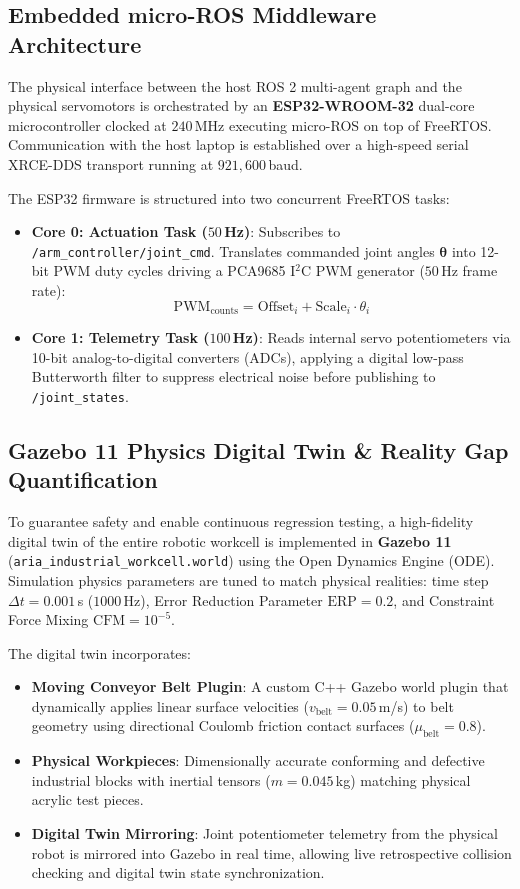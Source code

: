 \documentclass[journal]{IEEEtran}
\begin{document}
\subsection{Embedded micro-ROS Middleware Architecture}
The physical interface between the host ROS 2 multi-agent graph and the physical servomotors is orchestrated by an \textbf{ESP32-WROOM-32} dual-core microcontroller clocked at $240$\,MHz executing micro-ROS on top of FreeRTOS. Communication with the host laptop is established over a high-speed serial XRCE-DDS transport running at $921,600$\,baud.

The ESP32 firmware is structured into two concurrent FreeRTOS tasks:
\begin{itemize}
    \item \textbf{Core 0: Actuation Task ($50$\,Hz)}: Subscribes to \texttt{/arm\_controller/joint\_cmd}. Translates commanded joint angles $\boldsymbol{\theta}$ into 12-bit PWM duty cycles driving a PCA9685 I$^2$C PWM generator ($50$\,Hz frame rate):
    \begin{equation}
    \text{PWM}_{\text{counts}} = \text{Offset}_i + \text{Scale}_i \cdot \theta_i
    \end{equation}
    \item \textbf{Core 1: Telemetry Task ($100$\,Hz)}: Reads internal servo potentiometers via 10-bit analog-to-digital converters (ADCs), applying a digital low-pass Butterworth filter to suppress electrical noise before publishing to \texttt{/joint\_states}.
\end{itemize}

\subsection{Gazebo 11 Physics Digital Twin \& Reality Gap Quantification}
To guarantee safety and enable continuous regression testing, a high-fidelity digital twin of the entire robotic workcell is implemented in \textbf{Gazebo 11} (\texttt{aria\_industrial\_workcell.world}) using the Open Dynamics Engine (ODE). Simulation physics parameters are tuned to match physical realities: time step $\Delta t = 0.001$\,s ($1000$\,Hz), Error Reduction Parameter $\text{ERP} = 0.2$, and Constraint Force Mixing $\text{CFM} = 10^{-5}$.

The digital twin incorporates:
\begin{itemize}
    \item \textbf{Moving Conveyor Belt Plugin}: A custom C++ Gazebo world plugin that dynamically applies linear surface velocities ($v_{\text{belt}} = 0.05$\,m/s) to belt geometry using directional Coulomb friction contact surfaces ($\mu_{\text{belt}} = 0.8$).
    \item \textbf{Physical Workpieces}: Dimensionally accurate conforming and defective industrial blocks with inertial tensors ($m = 0.045$\,kg) matching physical acrylic test pieces.
    \item \textbf{Digital Twin Mirroring}: Joint potentiometer telemetry from the physical robot is mirrored into Gazebo in real time, allowing live retrospective collision checking and digital twin state synchronization.
\end{itemize}
\end{document}
